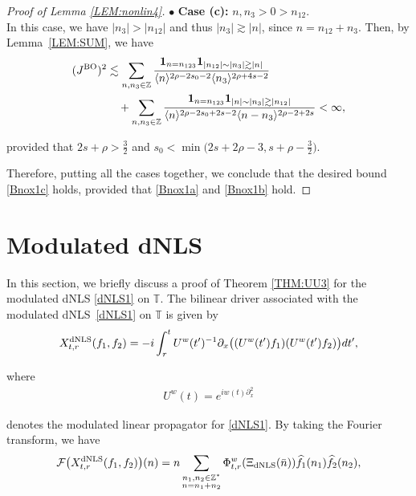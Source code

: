 \documentclass[letterpaper, 11pt,  reqno]{amsart}
\newcommand{\1}{\hspace{0.5mm}\text{I}\hspace{0.5mm}}
\newcommand{\noi}{\noindent}
\newcommand{\Z}{\mathbb{Z}}
\newcommand{\T}{\mathbb{T}}
\newcommand{\bul}{\bullet}
\newcommand{\F}{\mathcal{F}}
\newcommand{\ft}{\widehat}
\newcommand{\dx}{\partial_x}
\newcommand{\les}{\lesssim}
\newcommand{\ges}{\gtrsim}
\newcommand{\jb}[1]
{\langle #1 \rangle}
\newcommand{\ind}{\mathbf 1}
\newcommand{\uw}{U^w}
\newcommand{\sub}{\substack}
\newcommand{\BO}{\text{\rm BO} }
\newcommand{\dNLS}{\text{\rm dNLS} }
\numberwithin{equation}{section}
\numberwithin{theorem}{section}
\begin{document}
\begin{proof}[Proof of Lemma \ref{LEM:nonlin4}]
\noi
$\bul$ {\bf Case (c):} $n, n_3>0>n_{12}$.\\
\indent
In this case, we have $|n_{3}| > |n_{12}|$ and thus $|n_{3}| \ges |n|$,
since $n = n_{12} + n_3$.
Then, by Lemma~\ref{LEM:SUM},  we have
\begin{align*}
( J^\BO)^2
& \les  \sum_{n,  n_3 \in \Z}
\frac{\ind_{n = n_{123}}\ind_{|n_{12}|\sim |n_3| \ges |n|}}
{\jb{n}^{2\rho-2s_0 - 2}
\jb{n_3}^{2\rho + 4s-2}} \\
& 
\quad +   \sum_{n,  n_3 \in \Z}
\frac{\ind_{n = n_{123}}\ind_{|n|\sim |n_3| \ges |n_{12}|}}
{\jb{n}^{2\rho-2s_0 +2s - 2}
\jb{n - n_3}^{2\rho-2+2s}} < \infty, 
\end{align*}


\noi
provided that 
$2s + \rho  > \frac 32$ and $s_0 < \min\big(2s + 2\rho -3, s + \rho - \frac 32\big)$.




\medskip

Therefore, 
putting all the cases together, 
we conclude that  the desired bound \eqref{Bnox1c} holds, 
provided that \eqref{Bnox1a}
and \eqref{Bnox1b}
hold.
\end{proof}






\section{Modulated dNLS}
\label{SEC:NLS}


In this section, we briefly discuss a proof of Theorem \ref{THM:UU3}
for the modulated dNLS \eqref{dNLS1} on $\T$.
The bilinear driver associated with 
the modulated dNLS~\eqref{dNLS1} on $\T$ is given by 
\begin{align}
X^\dNLS_{t,r}( f _1, f _2)
=-i \int_r^t  \uw  (t')^{-1}
\dx \big( (\uw (t')   f _1)( \uw (t')  f_2)\big) dt',
\label{SX1}
\end{align}


\noi
where 
\begin{align*}
\uw (t)=e^{i w(t) \dx^2 }
\end{align*}

\noi
denotes 
the modulated linear propagator
for \eqref{dNLS1}.
By taking the Fourier transform, we have 
\begin{align*}
\F\big( X^\dNLS_{t,r}  ( f _1, f _2) \big)(n)  =
n  \sum_{ \sub {n_1, n_2 \in \Z^*\\ n = n_1+n_2}}
 \Phi_{t,r}^{w}(\Xi_\dNLS (\bar n))\ft  f_1 ( n_1 )  \ft   f_2 (n_2), 
\end{align*}
\end{document}
